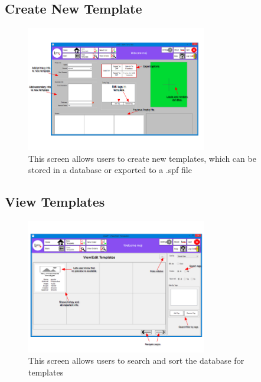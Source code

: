 \documentclass[oneside,openany,11pt,a4paper]{report}
\begin{document}
\subsection{Create New Template}
\begin{figure}[H]
	\centering
	\includegraphics[width=0.7\textwidth]{screen/newtemplate.png}
	\caption{This screen allows users to create new templates, which can be stored in a database or exported to a .spf file}
\end{figure}

\subsection{View Templates}
\begin{figure}[H]
	\centering
	\includegraphics[width=0.7\textwidth]{screen/templateviewer.png}
	\caption{This screen allows users to search and sort the database for templates}
\end{figure}
\end{document}
